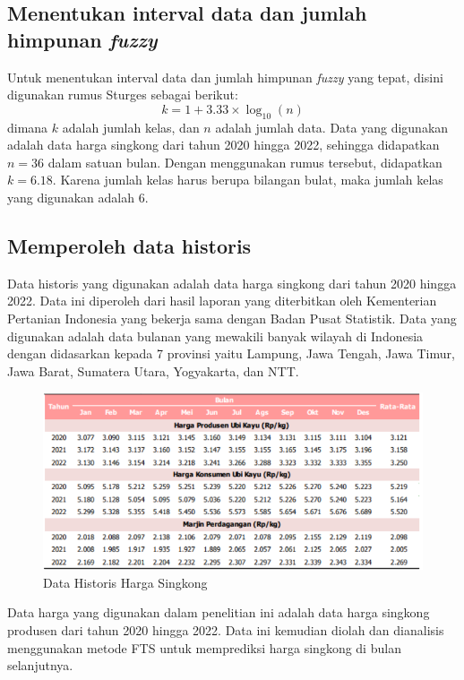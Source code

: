 \documentclass[conference]{IEEEtran}
\begin{document}
\subsection{Menentukan interval data dan jumlah himpunan \textit{fuzzy}}\label{AA}
Untuk menentukan interval data dan jumlah himpunan \textit{fuzzy} yang tepat, disini digunakan rumus Sturges sebagai berikut:
\begin{equation}
    k = 1 + 3.33 \times \log_{10}(n)
\end{equation}
dimana $k$ adalah jumlah kelas, dan $n$ adalah jumlah data. Data yang digunakan adalah data harga singkong dari tahun 2020 hingga 2022, sehingga didapatkan $n = 36$ dalam satuan bulan. Dengan menggunakan rumus tersebut, didapatkan $k = 6.18$. Karena jumlah kelas harus berupa bilangan bulat, maka jumlah kelas yang digunakan adalah 6.
\subsection{Memperoleh data historis}
Data historis yang digunakan adalah data harga singkong dari tahun 2020 hingga 2022. Data ini diperoleh dari hasil laporan yang diterbitkan oleh Kementerian Pertanian Indonesia yang bekerja sama dengan Badan Pusat Statistik. Data yang digunakan adalah data bulanan yang mewakili banyak wilayah di Indonesia dengan didasarkan kepada 7 provinsi yaitu Lampung, Jawa Tengah, Jawa Timur, Jawa Barat, Sumatera Utara, Yogyakarta, dan NTT.

\begin{figure}[H]
    \centering
    \includegraphics[width=\columnwidth]{images/Data Historis.png} 
    \caption{Data Historis Harga Singkong}
\end{figure}
Data harga yang digunakan dalam penelitian ini adalah data harga singkong produsen dari tahun 2020 hingga 2022. Data ini kemudian diolah dan dianalisis menggunakan metode FTS untuk memprediksi harga singkong di bulan selanjutnya.
\end{document}
